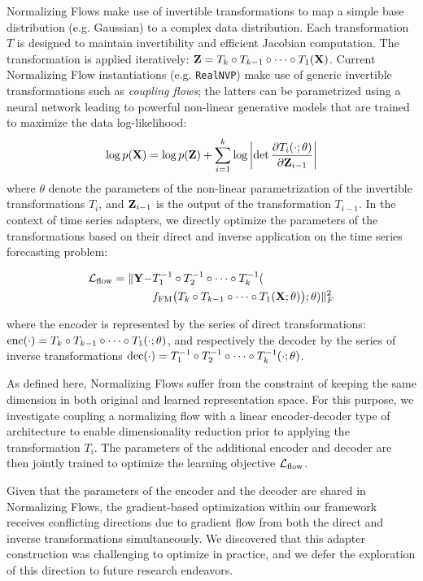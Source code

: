 Normalizing Flows make use of invertible transformations to map a simple base distribution (e.g. Gaussian) to a complex data distribution. Each transformation $ T $ is designed to maintain invertibility and efficient Jacobian computation. The transformation is applied iteratively: $ \mathbf{Z} = T_k \circ T_{k-1} \circ \dots \circ T_1(\mathbf{X}) $. Current Normalizing Flow instantiations (e.g. \texttt{RealNVP}) make use of generic invertible transformations such as \emph{coupling flows}; the latters can be parametrized using a neural network leading to powerful non-linear generative models that are trained to maximize the data log-likelihood:
\[
\log p(\mathbf{X}) = \log p(\mathbf{Z}) + \sum_{i=1}^k \log \left| \det \frac{\partial T_i(\cdot;\theta)}{\partial \mathbf{Z}_{i-1}} \right|
\]
where $\theta$ denote the parameters of the non-linear parametrization of the invertible transformations $T_i$, and $\mathbf{Z}_{i-1}$ is the output of the transformation $T_{i-1}$.
In the context of time series adapters, we directly optimize the parameters of the transformations based on their direct and inverse application on the time series forecasting problem:

\begin{equation*}
\begin{split}
\mathcal{L}_{\text{flow}} = \| \mathbf{Y} - &T^{-1}_{1} \circ T^{-1}_{2} \circ \dots \circ T^{-1}_k( \\ &f_{\mathrm{FM}} \big( T_k \circ T_{k-1} \circ \dots \circ T_1(\mathbf{X}; \theta) \big); \theta) \|_F^2
\end{split}
\end{equation*}

where the encoder is represented by the series of direct transformations: $\mathrm{enc}(\cdot) = T_k \circ T_{k-1} \circ \dots \circ T_1(\cdot; \theta)$, and respectively the decoder by the series of inverse transformations $\mathrm{dec}(\cdot) = T^{-1}_{1} \circ T^{-1}_{2} \circ \dots \circ T^{-1}_k(\cdot; \theta)$.

As defined here, Normalizing Flows suffer from the constraint of keeping the same dimension in both original and learned representation space. For this purpose, we investigate coupling a normalizing flow with a linear encoder-decoder type of architecture to enable dimensionality reduction prior to applying the transformation $T_i$. The parameters of the additional encoder and decoder are then jointly trained to optimize the learning objective $\mathcal{L}_{\text{flow}}$.

Given that the parameters of the encoder and the decoder are shared in Normalizing Flows, the gradient-based optimization within our framework receives conflicting directions due to gradient flow from both the direct and inverse transformations simultaneously. We discovered that this adapter construction was challenging to optimize in practice, and we defer the exploration of this direction to future research endeavors.


